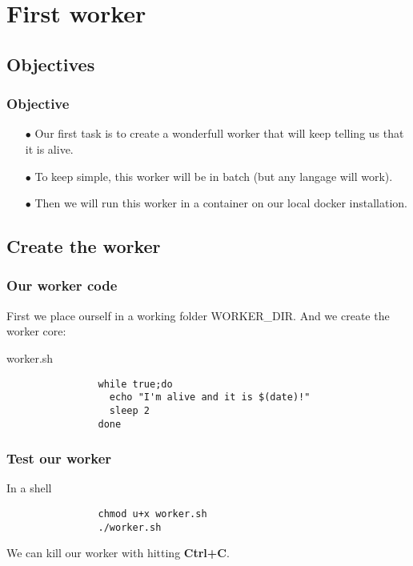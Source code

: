 \section{First worker}

\subsection{Objectives}	
	\begin{frame}
		\frametitle{Objective}
		
		\begin{itemize}
			\item[$\bullet$] Our first task is to create a wonderfull worker that will keep telling us that it is alive.
			\item[$\bullet$] To keep simple, this worker will be in batch (but any langage will work).	
			\item[$\bullet$] Then we will run this worker in a container on our local docker installation.
		\end{itemize}
		
	\end{frame}

\subsection{Create the worker}
	
	\begin{frame}[fragile]
		\frametitle{Our worker code}

		First we place ourself in a working folder WORKER\_DIR. And we create the worker core:
		
		\begin{block}{worker.sh}
			\begin{verbatim}
				while true;do
				  echo "I'm alive and it is $(date)!"
				  sleep 2
				done
			\end{verbatim}
		\end{block}
		
	\end{frame}

	\begin{frame}[fragile]
		\frametitle{Test our worker}
		
		\begin{block}{In a shell}
			\begin{verbatim}
				chmod u+x worker.sh
				./worker.sh
			\end{verbatim}
		\end{block}
		We can kill our worker with hitting \textbf{Ctrl+C}.
		
	\end{frame}
	
